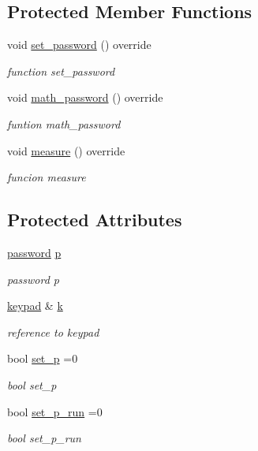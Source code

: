 \subsection*{Protected Member Functions}
\begin{DoxyCompactItemize}
\item 
void \hyperlink{classprofile_aa46b5ea874a915a76a54c4ce7fa9701c}{set\+\_\+password} () override
\begin{DoxyCompactList}\small\item\em function set\+\_\+password \end{DoxyCompactList}\item 
void \hyperlink{classprofile_a85a7931430f0cc2abc94253548b9cb37}{math\+\_\+password} () override
\begin{DoxyCompactList}\small\item\em funtion math\+\_\+password \end{DoxyCompactList}\item 
void \hyperlink{classprofile_a5cd64e12649b049cfee501c2e976bd96}{measure} () override
\begin{DoxyCompactList}\small\item\em funcion measure \end{DoxyCompactList}\end{DoxyCompactItemize}
\subsection*{Protected Attributes}
\begin{DoxyCompactItemize}
\item 
\hyperlink{classpassword}{password} \hyperlink{classprofile_afbf1e7946aa806c96044b94349a4bdad}{p}
\begin{DoxyCompactList}\small\item\em password p \end{DoxyCompactList}\item 
\hyperlink{classkeypad}{keypad} \& \hyperlink{classprofile_a0484e7cb5d93f01f21ad7cf8835c5ef9}{k}\hypertarget{classprofile_a0484e7cb5d93f01f21ad7cf8835c5ef9}{}\label{classprofile_a0484e7cb5d93f01f21ad7cf8835c5ef9}

\begin{DoxyCompactList}\small\item\em reference to keypad \end{DoxyCompactList}\item 
bool \hyperlink{classprofile_a82b3f6d034c00c6e180a3df4c46ce0f8}{set\+\_\+p} =0
\begin{DoxyCompactList}\small\item\em bool set\+\_\+p \end{DoxyCompactList}\item 
bool \hyperlink{classprofile_a0a35d68e263091faa4f4855f27ef3f38}{set\+\_\+p\+\_\+run} =0
\begin{DoxyCompactList}\small\item\em bool set\+\_\+p\+\_\+run \end{DoxyCompactList}\end{DoxyCompactItemize}
